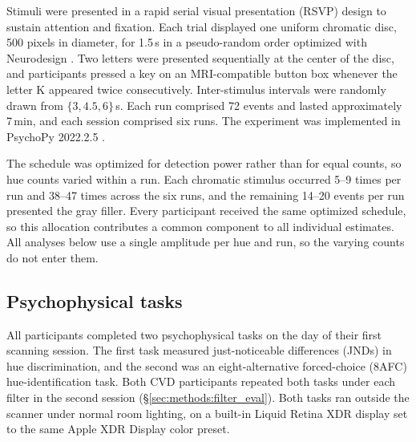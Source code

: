 Stimuli were presented in a rapid serial visual presentation (RSVP) design to sustain attention and fixation. Each trial displayed one uniform chromatic disc, 500 pixels in diameter, for 1.5\,s in a pseudo-random order optimized with Neurodesign \parencite{durnez2018}. Two letters were presented sequentially at the center of the disc, and participants pressed a key on an MRI-compatible button box whenever the letter K appeared twice consecutively. Inter-stimulus intervals were randomly drawn from $\{3, 4.5, 6\}$\,s. Each run comprised 72 events and lasted approximately 7\,min, and each session comprised six runs. The experiment was implemented in PsychoPy 2022.2.5 \parencite{peirce2019}.

The schedule was optimized for detection power rather than for equal counts, so hue counts varied within a run. Each chromatic stimulus occurred 5--9 times per run and 38--47 times across the six runs, and the remaining 14--20 events per run presented the gray filler. Every participant received the same optimized schedule, so this allocation contributes a common component to all individual estimates. All analyses below use a single amplitude per hue and run, so the varying counts do not enter them.

\subsection{Psychophysical tasks}
\label{sec:methods:psychophysical}

All participants completed two psychophysical tasks on the day of their first scanning session. The first task measured just-noticeable differences (JNDs) in hue discrimination, and the second was an eight-alternative forced-choice (8AFC) hue-identification task. Both CVD participants repeated both tasks under each filter in the second session (\S\ref{sec:methods:filter_eval}). Both tasks ran outside the scanner under normal room lighting, on a built-in Liquid Retina XDR display set to the same Apple XDR Display color preset.

